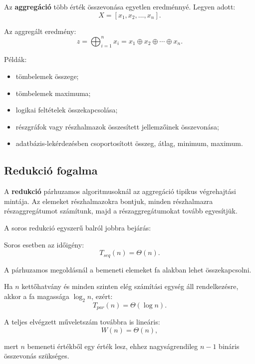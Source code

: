Az \textbf{aggregáció} több érték összevonása egyetlen eredménnyé. Legyen adott:
\[
  X=[x_1,x_2,\ldots,x_n].
\]

Az aggregált eredmény:
\[
  z=\bigoplus_{i=1}^{n} x_i=x_1\oplus x_2\oplus\cdots\oplus x_n.
\]

Példák:

\begin{itemize}
  \item tömbelemek összege;
  \item tömbelemek maximuma;
  \item logikai feltételek összekapcsolása;
  \item részgráfok vagy részhalmazok összesített jellemzőinek összevonása;
  \item adatbázis-lekérdezésben csoportosított összeg, átlag, minimum, maximum.
\end{itemize}

\subsection{Redukció fogalma}

A \textbf{redukció} párhuzamos algoritmusoknál az aggregáció tipikus végrehajtási mintája. Az elemeket részhalmazokra bontjuk, minden részhalmazra részaggregátumot számítunk, majd a részaggregátumokat tovább egyesítjük.

A soros redukció egyszerű balról jobbra bejárás:


Soros esetben az időigény:
\[
  T_{seq}(n)=\Theta(n).
\]

A párhuzamos megoldásnál a bemeneti elemeket fa alakban lehet összekapcsolni.




Ha $n$ kettőhatvány és minden szinten elég számítási egység áll rendelkezésre, akkor a fa magassága $\log_2 n$, ezért:
\[
  T_{par}(n)=\Theta(\log n).
\]

A teljes elvégzett műveletszám továbbra is lineáris:
\[
  W(n)=\Theta(n),
\]

mert $n$ bemeneti értékből egy érték lesz, ehhez nagyságrendileg $n-1$ bináris összevonás szükséges.

